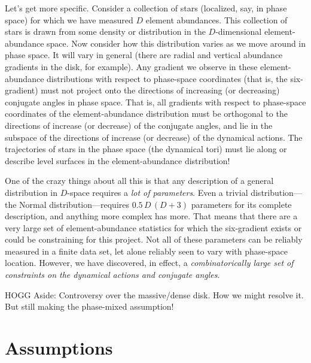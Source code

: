 \documentclass[modern]{aastex62}
\begin{document}
Let's get more specific.
Consider a collection of stars (localized, say, in phase space) for which we have
measured $D$ element abundances.
This collection of stars is drawn from some density or distribution in
the $D$-dimensional element-abundance space.
Now consider how this distribution varies as we move around in phase space.
It will vary in general (there are radial and vertical abundance gradients in the
disk, for example).
Any gradient we observe in these element-abundance distributions with respect to
phase-space coordinates (that is, the six-gradient) must not project
onto the directions of increasing (or decreasing) conjugate angles in phase space.
That is, all gradients with respect to phase-space coordinates
of the element-abundance distribution must be orthogonal to the
directions of increase (or decrease) of the conjugate angles, and lie in the subspace
of the directions of increase (or decrease) of the dynamical actions.
The trajectories of stars in the phase space (the dynamical tori) must lie along or
describe level surfaces in the element-abundance distribution!

One of the crazy things about all this is that any description of a general distribution in $D$-space
requires a \emph{lot of parameters}.
Even a trivial distribution---the Normal distribution---requires $0.5\,D\,(D+3)$ parameters for its
complete description, and anything more complex has more.
That means that there are a very large set of element-abundance statistics for which the
six-gradient exists or could be constraining for this project.
Not all of these parameters can be reliably measured in a finite data set,
let alone reliably seen to vary with phase-space location.
However,
we have discovered, in effect, a \emph{combinatorically large set of constraints on the
dynamical actions and conjugate angles}.

HOGG Aside: Controversy over the massive/dense disk. How we might resolve it.
But still making the phase-mixed assumption!

\section{Assumptions}
\end{document}

